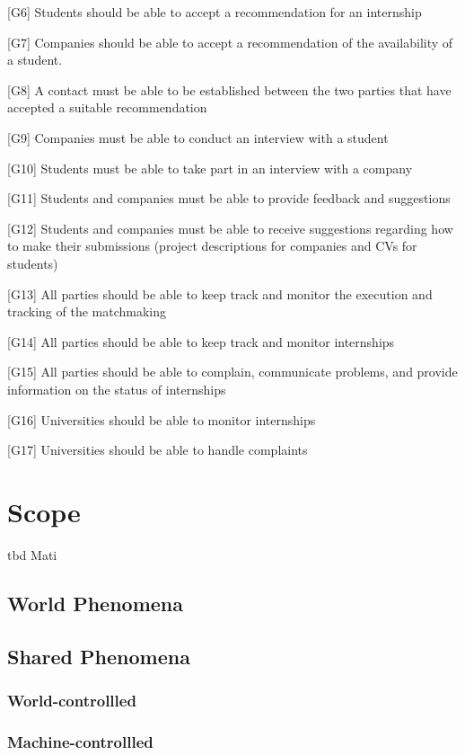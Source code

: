 [G6] Students should be able to accept a recommendation for an internship  

[G7] Companies should be able to accept a recommendation of the availability of a student. 

[G8] A contact must be able to be established between the two parties that have accepted a suitable recommendation  


[G9] Companies must be able to conduct an interview with a student 


[G10] Students must be able to take part in an interview with a company

[G11] Students and companies must be able to provide feedback and suggestions

[G12] Students and companies must be able to receive suggestions regarding how to make their submissions (project descriptions for companies and CVs for students)

[G13] All parties should be able to keep track and monitor the execution and tracking of the matchmaking

[G14] All parties should be able to keep track and monitor internships

[G15] All parties should be able to complain, communicate problems, and provide information on the status of internships

[G16] Universities should be able to monitor internships

[G17] Universities should be able to handle complaints



\section{Scope}



tbd Mati


\subsection{World Phenomena}
\subsection{Shared Phenomena}
\subsubsection{World-controllled}
\subsubsection{Machine-controllled}

